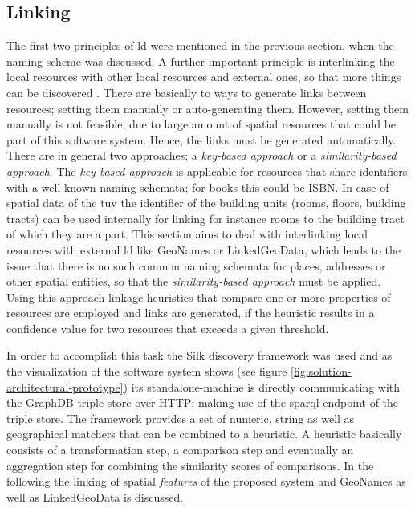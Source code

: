 \documentclass[draft,final]{vutinfth} %
\begin{document}
\subsection{Linking}
\label{solution-architectural-prototype:linking}
The first two principles of \gls{ld} were mentioned in the previous section, when the naming scheme was discussed. A further important principle is interlinking the local resources with other local resources and external ones, so that more things can be discovered \cite{berners-lee_linked_2009}. There are basically to ways to generate links between resources; setting them manually or auto-generating them. However, setting them manually is not feasible, due to large amount of spatial resources that could be part of this software system. Hence, the links must be generated automatically. There are in general two approaches; a \textit{key-based approach} or a \textit{similarity-based approach}\cite{heath_linked_2011}. The \textit{key-based approach} is applicable for resources that share identifiers with a well-known naming schemata; for books this could be ISBN. In case of spatial data of the \gls{tuv} the identifier of the building units (rooms, floors, building tracts) can be used internally for linking for instance rooms to the building tract of which they are a part. This section aims to deal with interlinking local resources with external \gls{ld} like GeoNames or LinkedGeoData, which leads to the issue that there is no such common naming schemata for places, addresses or other spatial entities, so that the \textit{similarity-based approach} must be applied. Using this approach linkage heuristics that compare one or more properties of resources are employed and links are generated, if the heuristic results in a confidence value for two resources that exceeds a given threshold.

In order to accomplish this task the Silk discovery framework\cite{volz_discovering_2009} was used and as the visualization of the software system shows (see figure \ref{fig:solution-architectural-prototype}) its standalone-machine is directly communicating with the GraphDB triple store over HTTP; making use of the \gls{sparql} endpoint of the triple store. The framework provides a set of numeric, string as well as geographical matchers that can be combined to a heuristic. A heuristic basically consists of a transformation step, a comparison step and eventually an aggregation step for combining the similarity scores of comparisons. In the following the linking of spatial \textit{features} of the proposed system and GeoNames as well as LinkedGeoData is discussed.
\end{document}
